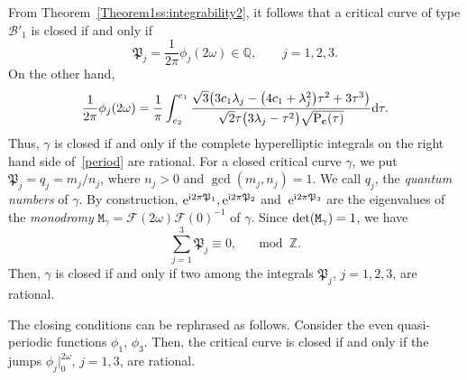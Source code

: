 \documentclass[10pt,a4paper]{amsart}
\numberwithin{equation}{section}
\def\Q{\mathbb{Q}}
\begin{document}
From Theorem~\ref{Theorem1ss:integrability2}, it follows that a critical curve of type ${\mathcal B}'_1$
is closed if and only if
\[
 {\mathfrak P}_j=\frac{1}{2\pi}\phi_j(2\omega)\in \Q,\qquad j=1,2,3.
\]
On the other hand,
\begin{equation}\label{period}
 \frac{1}{2\pi}\phi_j(2\omega)=\frac{1}{\pi}\int_{e_2}^{e_1} \frac{\sqrt{3}\big(3c_1\lambda_j-\big(4c_1+\lambda_j^2\big)\tau^2+3\tau^3\big)} {\sqrt{2}\tau\big(3\lambda_j-\tau^2\big)\sqrt{{\rm P}_{{\bf c}}(\tau)}}{\rm d}\tau.
 \end{equation}
Thus, $\gamma$ is closed if and only if the complete hyperelliptic integrals on the right hand side of~\eqref{period} are rational.
For a closed critical curve $\gamma$, we put ${\mathfrak P}_j= q_j=m_j/n_j$, where $n_j>0$ and $\gcd(m_j,n_j)=1$.
We call $q_j$, the \emph{quantum numbers} of $\gamma$.
By construction, ${\rm e}^{{\rm i}2\pi{\mathfrak P}_1}, {\rm e}^{{\rm i}2\pi {\mathfrak P}_2}$ and~${\rm e}^{{\rm i}2\pi {\mathfrak P}_3}$ are the eigenvalues of the \emph{monodromy} ${\mathtt M}_{\gamma}={\mathcal F}(2\omega){\mathcal F}(0)^{-1}$ of $\gamma$.
Since ${\rm det}({\mathtt M}_{\gamma})=1$, we have
\[
 \sum_{j=1}^{3} {\mathfrak P}_j\equiv 0,\quad \mod{\mathbb Z}.
\]
 Then, $\gamma$ is closed if and only if two among the integrals ${\mathfrak P}_j$, $j=1,2,3$, are rational.

\begin{Remark}
 The closing conditions can be rephrased as follows. Consider the even quasi-periodic functions $\phi_1$, $\phi_3$.
 Then, the critical curve is closed if and only if the jumps $\phi_j|_0^{2\omega}$, $j=1,3$, are rational.
 \end{Remark}
\end{document}
